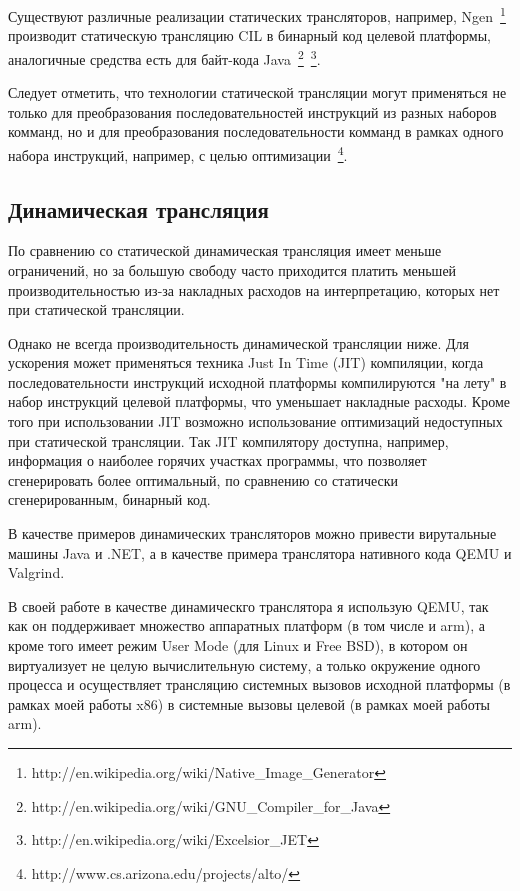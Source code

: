 Существуют различные реализации статических трансляторов, например, Ngen~\footnote{http://en.wikipedia.org/wiki/Native\_Image\_Generator} производит статическую трансляцию CIL в бинарный код целевой платформы, аналогичные средства есть для байт-кода Java~\footnote{http://en.wikipedia.org/wiki/GNU\_Compiler\_for\_Java}~\footnote{http://en.wikipedia.org/wiki/Excelsior\_JET}.

Следует отметить, что технологии статической трансляции могут применяться не только для преобразования последовательностей инструкций из разных наборов комманд, но и для преобразования последовательности комманд в рамках одного набора инструкций, например, с целью оптимизации~\footnote{http://www.cs.arizona.edu/projects/alto/}.

\subsection{Динамическая трансляция}

По сравнению со статической динамическая трансляция имеет меньше ограничений, но за большую свободу часто приходится платить меньшей производительностью из-за накладных расходов на интерпретацию, которых нет при статической трансляции.

Однако не всегда производительность динамической трансляции ниже. Для ускорения может применяться техника Just In Time (JIT) компиляции, когда последовательности инструкций исходной платформы компилируются "на лету" в набор инструкций целевой платформы, что уменьшает накладные расходы. Кроме того при использовании JIT возможно использование оптимизаций недоступных при статической трансляции. Так JIT компилятору доступна, например, информация о наиболее горячих участках программы, что позволяет сгенерировать более оптимальный, по сравнению со статически сгенерированным, бинарный код.

В качестве примеров динамических трансляторов можно привести вирутальные машины Java и .NET, а в качестве примера транслятора нативного кода QEMU и Valgrind.

В своей работе в качестве динамическго транслятора я использую QEMU, так как он поддерживает множество аппаратных платформ (в том числе и arm), а кроме того имеет режим User Mode (для Linux и Free BSD), в котором он виртуализует не целую вычислительную систему, а только окружение одного процесса и осуществляет трансляцию системных вызовов исходной платформы (в рамках моей работы x86) в системные вызовы целевой (в рамках моей работы arm).

